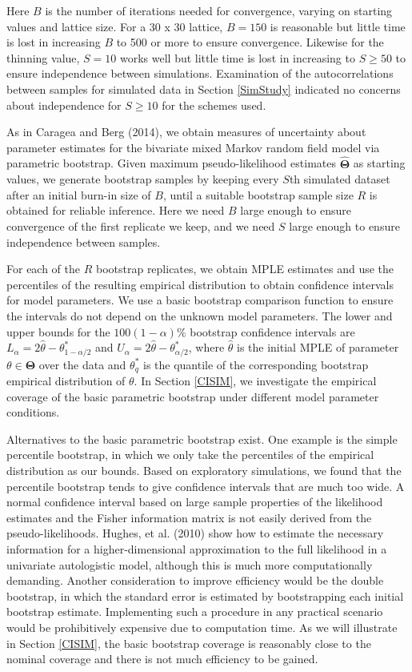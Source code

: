 \documentclass[12pt, a4paper, twoside]{article}
\begin{document}
Here $B$ is the number of iterations needed for convergence, varying on starting values and lattice size. For a 30 x 30 lattice, $B=150$ is reasonable but little time is lost in increasing $B$ to 500 or more to ensure convergence. Likewise for the thinning value, $S=10$ works well but little time is lost in increasing to $S\geq 50$ to ensure independence between simulations. Examination of the autocorrelations between samples for simulated data in Section \ref{SimStudy} indicated no concerns about independence for $S\geq10$ for the schemes used.

As in Caragea and Berg (2014), we obtain measures of uncertainty about parameter estimates for the bivariate mixed Markov random field model via parametric bootstrap. Given maximum pseudo-likelihood estimates $\hat{\boldsymbol{\Theta}}$ as starting values, we generate bootstrap samples by keeping every $S$th simulated dataset after an initial burn-in size of $B$, until a suitable bootstrap sample size $R$ is obtained for reliable inference. Here we need $B$ large enough to ensure convergence of the first replicate we keep, and we need $S$ large enough to ensure independence between samples.

For each of the $R$ bootstrap replicates, we obtain MPLE estimates and use the percentiles of the resulting empirical distribution to obtain confidence intervals for model parameters. We use a basic bootstrap comparison function to ensure the intervals do not depend on the unknown model parameters. The lower and upper bounds for the $100(1-\alpha)\%$ bootstrap confidence intervals are $L_\alpha = 2\hat{\theta} - \theta^*_{1-\alpha/2}$  and  $U_\alpha = 2\hat{\theta} - \theta^*_{\alpha/2}$,
where $\hat{\theta}$ is the initial MPLE of parameter $\theta\in\boldsymbol{\Theta}$ over the data and $\theta^*_q$ is the quantile of the corresponding bootstrap empirical distribution of $\theta$. In Section \ref{CISIM}, we investigate the empirical coverage of the basic parametric bootstrap under different model parameter conditions.

Alternatives to the basic parametric bootstrap exist. One example is the simple percentile bootstrap, in which we only take the percentiles of the empirical distribution as our bounds. Based on exploratory simulations, we found that the percentile bootstrap tends to give confidence intervals that are much too wide. A normal confidence interval based on large sample properties of the likelihood estimates and the Fisher information matrix is not easily derived from the pseudo-likelihoods. Hughes, et al. (2010) show how to estimate the necessary information for a higher-dimensional approximation to the full likelihood in a univariate autologistic model, although this is much more computationally demanding. Another consideration to improve efficiency would be the double bootstrap, in which the standard error is estimated by bootstrapping each initial bootstrap estimate. Implementing such a procedure in any practical scenario would be prohibitively expensive due to computation time. As we will illustrate in Section \ref{CISIM}, the basic bootstrap coverage is reasonably close to the nominal coverage and there is not much efficiency to be gained.
\end{document}
